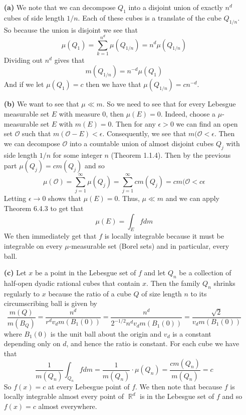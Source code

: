 \documentclass{article}
\DeclareMathOperator{\R}{\mathbb{R}}
\newcommand{\exercise}[1]{\noindent{\textbf{Exercise #1:}}}
\begin{document}
\exercise{6.7.8}
\begin{enumerate}
\item [\textbf{(a)}] We note that we can decompose $Q_1$ into a
  disjoint union of exactly $n^d$ cubes of side length $1/n$. Each of
  these cubes is a translate of the cube $Q_{1/n}$. So because the
  union is disjoint we see that
  \[
  \mu(Q_1) = \sum_{k=1}^{n^d}\mu(Q_{1/n}) = n^d\mu(Q_{1/n})
  \]
  Dividing out $n^d$ gives that
  \[
  m(Q_{1/n}) = n^{-d}\mu(Q_1)
  \]
  And if we let $\mu(Q_1) = c$ then we have that $\mu(Q_{1/n}) = cn^{-d}$.
\item [\textbf{(b)}] We want to see that $\mu \ll m$. So we need to
  see that for every Lebesgue measurable set $E$ with measure 0, then
  $\mu(E) = 0$. Indeed, choose a $\mu$-measurable set $E$ with $m(E) =
  0$.  Then for any $\epsilon >0$ we can find an open set
  $\mathcal{O}$ such that $m(\mathcal{O}-E) < \epsilon$. Consequently,
  we see that $m(\mathcal{O} < \epsilon$. Then we can decompose
  $\mathcal{O}$ into a countable union of almost disjoint cubes $Q_j$
  with side length $1/n$ for some integer $n$ (Theorem 1.1.4). Then by
  the previous part $\mu(Q_j) = cm(Q_j)$ and so
  \[
  \mu(\mathcal{O}) = \sum_{j=1}^\infty \mu(Q_j) = \sum_{j=1}^\infty
  cm(Q_j) = cm(\mathcal{O} < c\epsilon
  \]
  Letting $\epsilon \to 0$ shows that $\mu(E) = 0$. Thus, $\mu \ll m$
  and we can apply Theorem 6.4.3 to get that
  \[
  \mu(E) = \int_E fdm
  \]
  We then immediately get that $f$ is locally integrable because it
  must be integrable on every $\mu$-measurable set (Borel sets) and in
  particular, every ball.
\item [\textbf{(c)}] Let $x$ be a point in the Lebesgue set of $f$ and
  let $Q_n$ be a collection of half-open dyadic rational cubes that
  contain $x$. Then the family $Q_n$ shrinks regularly to $x$ because
  the ratio of a cube $Q$ of size length $n$ to its circumscribing ball is
  given by
  \[
  \frac{m(Q)}{m(B_Q)} = \frac{n^d}{r^dv_dm(B_1(0))} =
  \frac{n^d}{2^{-1/2}n^dv_dm(B_1(0))} = \frac{\sqrt{2}}{v_dm(B_1(0))}
  \]
  where $B_1(0)$ is the unit ball about the origin and $v_d$ is a
  constant depending only on $d$, and hence the ratio is constant. For
  each cube we have that
  \[
  \frac{1}{m(Q_n)}\int_{Q_n}fdm = \frac{1}{m(Q_n)}\cdot\mu(Q_n) =
  \frac{cm(Q_n)}{m(Q_n)} = c
  \]
  So $f(x) = c$ at every Lebesgue point of $f$. We then note that
  because $f$ is locally integrable almost every point of $\R^d$ is in
  the Lebesgue set of $f$ and so $f(x) = c$ almost everywhere.
\end{enumerate}
\end{document}
